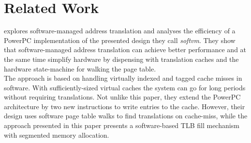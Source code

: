\chapter{Related Work}

\label{chap:related}



\cite{jacobSoftwaremanagedAddressTranslation1997} explores software-managed
address translation and analyses the efficiency of a PowerPC implementation
of the presented design they call \textit{softvm}. They show that
software-managed address translation can achieve better performance and
at the same time simplify hardware by dispensing with translation caches and
the hardware state-machine for walking the page table.\\
The approach is based on handling virtually indexed and tagged cache misses in
software.
With sufficiently-sized virtual caches the system can go for long periods
without requiring translations.
Not unlike this paper, they extend the PowerPC architecture by two new instructions
to write entries to the cache. However, their design uses software page table
walks to find translations on cache-miss, while the approach presented in this
paper presents a software-based TLB fill mechanism with segmented
memory allocation.\\\\


\cite{barrTranslationCachingSkip}





